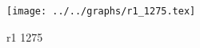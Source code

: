 \begin{figure}[h] \centering\texttt{[image: ../../graphs/r1\_1275.tex]}\caption{r1 1275}\label{gr:r1_1275} \end{figure}
